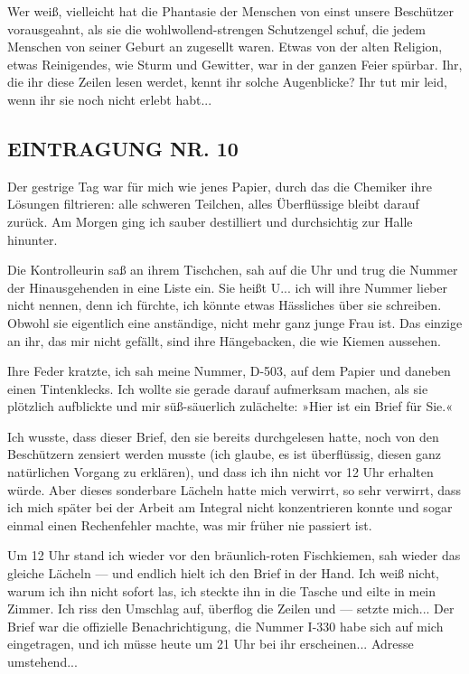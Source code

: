 Wer weiß, vielleicht hat die Phantasie der Menschen von einst
unsere Beschützer vorausgeahnt, als sie die wohlwollend-strengen
Schutzengel schuf, die jedem Menschen von seiner Geburt an
zugesellt waren. Etwas von der alten Religion, etwas Reinigendes,
wie Sturm und Gewitter, war in der ganzen Feier spürbar. Ihr, die
ihr diese Zeilen lesen werdet, kennt ihr solche Augenblicke? Ihr
tut mir leid, wenn ihr sie noch nicht erlebt habt...

\subsection{EINTRAGUNG NR. 10}

Der gestrige Tag war für mich wie jenes Papier, durch das die
Chemiker ihre Lösungen filtrieren: alle schweren Teilchen, alles
Überflüssige bleibt darauf zurück. Am Morgen ging ich sauber
destilliert und durchsichtig zur Halle hinunter.

Die Kontrolleurin saß an ihrem Tischchen, sah auf die Uhr und trug
die Nummer der Hinausgehenden in eine Liste ein. Sie heißt U... ich
will ihre Nummer lieber nicht nennen, denn ich fürchte, ich könnte
etwas Hässliches über sie schreiben. Obwohl sie eigentlich eine
anständige, nicht mehr ganz junge Frau ist. Das einzige an ihr, das
mir nicht gefällt, sind ihre Hängebacken, die wie Kiemen aussehen.

Ihre Feder kratzte, ich sah meine Nummer, D-503, auf dem Papier und
daneben einen Tintenklecks. Ich wollte sie gerade darauf aufmerksam
machen, als sie plötzlich aufblickte und mir süß-säuerlich
zulächelte: »Hier ist ein Brief für Sie.«

Ich wusste, dass dieser Brief, den sie bereits durchgelesen hatte,
noch von den Beschützern zensiert werden musste (ich glaube, es ist
überflüssig, diesen ganz natürlichen Vorgang zu erklären), und dass
ich ihn nicht vor 12 Uhr erhalten würde. Aber dieses sonderbare
Lächeln hatte mich verwirrt, so sehr verwirrt, dass ich mich später
bei der Arbeit am Integral nicht konzentrieren konnte und sogar
einmal einen Rechenfehler machte, was mir früher nie passiert ist.

Um 12 Uhr stand ich wieder vor den bräunlich-roten Fischkiemen, sah
wieder das gleiche Lächeln — und endlich hielt ich den Brief in der
Hand. Ich weiß nicht, warum ich ihn nicht sofort las, ich steckte
ihn in die Tasche und eilte in mein Zimmer. Ich riss den Umschlag
auf, überflog die Zeilen und — setzte mich... Der Brief war die
offizielle Benachrichtigung, die Nummer I-330 habe sich auf mich
eingetragen, und ich müsse heute um 21 Uhr bei ihr erscheinen...
Adresse umstehend...

